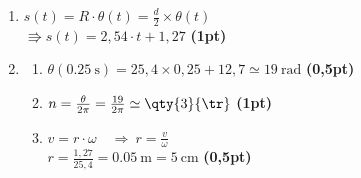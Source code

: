 \begin{enumerate}
\begin{enumerate}
              \item $\theta(t)=\omega\cdot t+\theta_{0}$ \\
                    $\Rrightarrow\theta(t)=25,4\cdot t+12,7
                    \quad (\unit{\radian})$
                    \hfill\textbf{(0,5pt)}

              \item $f=\frac{\omega}{2\pi}=\frac{25,4}{2\pi}\simeq
                     \qty{4}{\hertz}$
                    \hfill\textbf{(0,75pt)}

                    $f=4 \times 60=\qty{240}{\tr\per\min}$
                    \hfill\textbf{(0,25pt)}
              \item $T=\frac{1}{f}=\frac{1}{4}=\qty{0.25}{\second}$
                    \hfill\textbf{(0,5pt)}
          \end{enumerate}
    \item $s(t)=R\cdot\theta(t)=\frac{d}{2}\times\theta(t)$ \\
          $\Rrightarrow s(t)=2,54\cdot t+1,27$
          \hfill\textbf{(1pt)}

    \item
          \begin{enumerate}
              \item $\theta(\qty{0,25}{\second})=
                     25,4\times 0,25+12,7\simeq \qty{19}{\radian}$
                    \hfill\textbf{(0,5pt)}

              \item $n=\frac{\theta}{2\pi}=\frac{19}{2\pi}\simeq \qty{3}{\tr}$
                    \hfill\textbf{(1pt)}

              \item $v=r\cdot\omega \quad\Rightarrow\ r=\frac{v}{\omega}$ \\
                    $r=\frac{1,27}{25,4}=\qty{0.05}{\meter}=\qty{5}{\cm}$
                    \hfill\textbf{(0,5pt)}
          \end{enumerate}
\end{enumerate}
